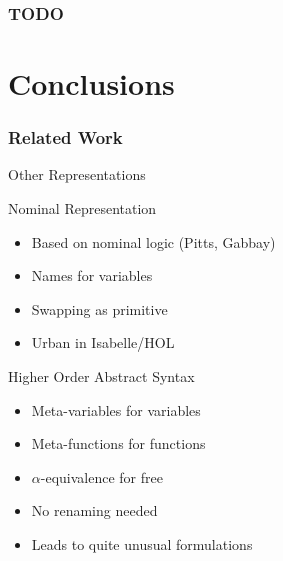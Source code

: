 \documentclass[notheorems]{beamer}
\begin{document}


\begin{frame}

  \frametitle{TODO}

\end{frame}


\section{Conclusions}




\begin{frame}

  \frametitle{Related Work}

  Other Representations

  \begin{block}{Nominal Representation}
    \begin{itemize}
    \item Based on nominal logic (Pitts, Gabbay)
    \item Names for variables
    \item Swapping as primitive
    \item Urban in Isabelle/HOL
    \end{itemize}
  \end{block}

  \begin{block}{Higher Order Abstract Syntax}
    \begin{itemize}
    \item Meta-variables for variables
    \item Meta-functions for functions
    \item $\alpha$-equivalence for free
    \item No renaming needed
    \item Leads to quite unusual formulations
    \end{itemize}
  \end{block}

\end{frame}
\end{document}
